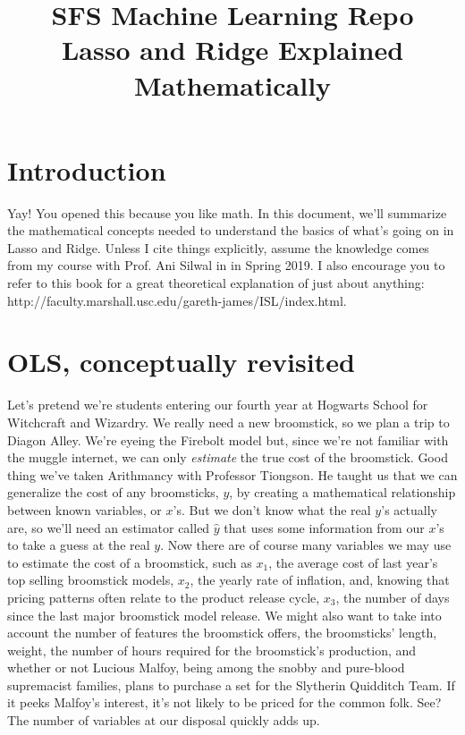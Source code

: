 \documentclass{article}                 %
\title{ SFS Machine Learning Repo \\ Lasso and Ridge Explained Mathematically }
\author{}
\date{}                    							%
\begin{document}
	\maketitle
	\tableofcontents       %

	\newpage

\section{Introduction}
	Yay! You opened this because you like math. In this document, we'll summarize the mathematical concepts needed to understand the basics of what's going on in Lasso and Ridge. Unless I cite things explicitly, assume the knowledge comes from my course with Prof. Ani Silwal in in Spring 2019. I also encourage you to refer to this book for a great theoretical explanation of just about anything: http://faculty.marshall.usc.edu/gareth-james/ISL/index.html.

\newpage
\section{OLS, conceptually revisited}
	Let's pretend we're students entering our fourth year at Hogwarts School for Witchcraft and Wizardry. We really need a new broomstick, so we plan a trip to Diagon Alley. We're eyeing the Firebolt model but, since we're not familiar with the muggle internet, we can only \textit{estimate} the true cost of the broomstick. Good thing we've taken Arithmancy with Professor Tiongson. He taught us that we can generalize the cost of any broomsticks, $y$, by creating a mathematical relationship between known variables, or $x$'s. But we don't know what the real $y$'s actually are, so we'll need an estimator called $\hat{y}$ that uses some information from our $x$'s to take a guess at the real $y$. Now there are of course many variables we may use to estimate the cost of a broomstick, such as $x_1$, the average cost of last year's top selling broomstick models, $x_2$, the yearly rate of inflation, and, knowing that pricing patterns often relate to the product release cycle, $x_3$, the number of days since the last major broomstick model release. We might also want to take into account the number of features the broomstick offers, the broomsticks' length, weight, the number of hours required for the broomstick's production, and whether or not Lucious Malfoy, being among the snobby and pure-blood supremacist families, plans to purchase a set for the Slytherin Quidditch Team. If it peeks Malfoy's interest, it's not likely to be priced for the common folk. See? The number of variables at our disposal quickly adds up.
\end{document}
